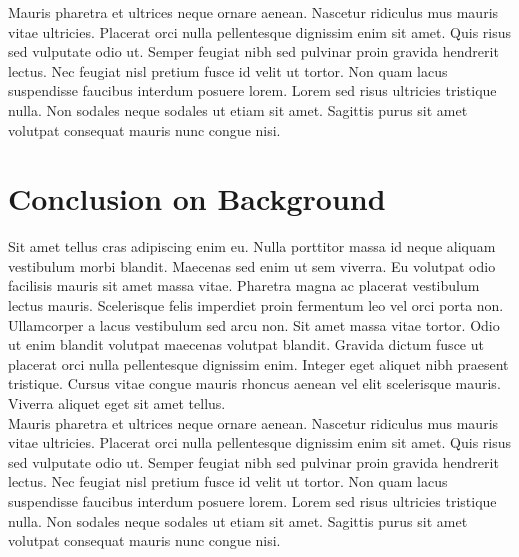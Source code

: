 Mauris pharetra et ultrices neque ornare aenean. Nascetur ridiculus mus mauris vitae ultricies. Placerat orci nulla pellentesque dignissim enim sit amet. Quis risus sed vulputate odio ut. Semper feugiat nibh sed pulvinar proin gravida hendrerit lectus. Nec feugiat nisl pretium fusce id velit ut tortor. Non quam lacus suspendisse faucibus interdum posuere lorem. Lorem sed risus ultricies tristique nulla. Non sodales neque sodales ut etiam sit amet. Sagittis purus sit amet volutpat consequat mauris nunc congue nisi.


\section{Conclusion on Background}

Sit amet tellus cras adipiscing enim eu. Nulla porttitor massa id neque aliquam vestibulum morbi blandit. Maecenas sed enim ut sem viverra. Eu volutpat odio facilisis mauris sit amet massa vitae. Pharetra magna ac placerat vestibulum lectus mauris. Scelerisque felis imperdiet proin fermentum leo vel orci porta non. Ullamcorper a lacus vestibulum sed arcu non. Sit amet massa vitae tortor. Odio ut enim blandit volutpat maecenas volutpat blandit. Gravida dictum fusce ut placerat orci nulla pellentesque dignissim enim. Integer eget aliquet nibh praesent tristique. Cursus vitae congue mauris rhoncus aenean vel elit scelerisque mauris. Viverra aliquet eget sit amet tellus.\\

Mauris pharetra et ultrices neque ornare aenean. Nascetur ridiculus mus mauris vitae ultricies. Placerat orci nulla pellentesque dignissim enim sit amet. Quis risus sed vulputate odio ut. Semper feugiat nibh sed pulvinar proin gravida hendrerit lectus. Nec feugiat nisl pretium fusce id velit ut tortor. Non quam lacus suspendisse faucibus interdum posuere lorem. Lorem sed risus ultricies tristique nulla. Non sodales neque sodales ut etiam sit amet. Sagittis purus sit amet volutpat consequat mauris nunc congue nisi.
